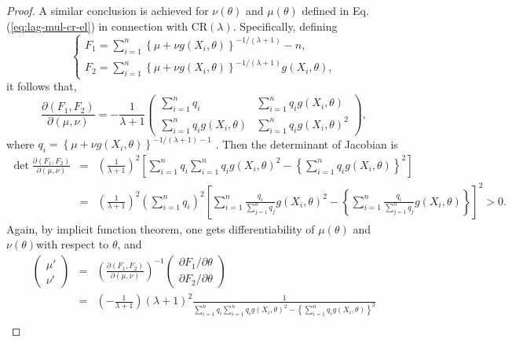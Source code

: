 \begin{proof}
A similar conclusion is achieved for $\nu\left(\theta\right)$ and
$\mu\left(\theta\right)$ defined in Eq. (\ref{eq:lag-mul-cr-el}) in
connection with CR$\left(\lambda\right)$. Specifically, defining
\[
\begin{cases}
F_{1}=\sum_{i=1}^{n}\left\{ \mu+\nu g\left(X_{i},\theta\right)\right\} ^{-1/(\lambda+1)}-n,\\
F_{2}=\sum_{i=1}^{n}\left\{ \mu+\nu g\left(X_{i},\theta\right)\right\} ^{-1/(\lambda+1)}g\left(X_{i},\theta\right),
\end{cases}
\]
it follows that,
\[
\frac{\partial\left(F_{1},F_{2}\right)}{\partial\left(\mu,\nu\right)}=-\frac{1}{\lambda+1}\left(\begin{array}{cc}
\sum_{i=1}^{n}q_{i} & \sum_{i=1}^{n}q_{i} g\left(X_{i},\theta\right)\\
\sum_{i=1}^{n}q_{i} g\left(X_{i},\theta\right) & \sum_{i=1}^{n}q_{i} g\left(X_{i},\theta\right)^{2}
\end{array}\right),
\]
 where $q_{i}=\left\{ \mu+\nu g\left(X_{i},\theta\right)\right\} ^{-1/(\lambda+1)-1}$
. Then the determinant of Jacobian is 
\begin{eqnarray*}
\det\frac{\partial\left(F_{1},F_{2}\right)}{\partial\left(\mu,\nu\right)} & = & \left(\frac{1}{\lambda+1}\right)^{2}\left[\sum_{i=1}^{n}q_{i}\sum_{i=1}^{n}q_{i}g\left(X_{i},\theta\right)^{2}-\left\{ \sum_{i=1}^{n}q_{i}g\left(X_{i},\theta\right)\right\} ^{2}\right]\\
 & = & \left(\frac{1}{\lambda+1}\right)^{2}\left(\sum_{i=1}^{n}q_{i}\right)^{2}\left[\sum_{i=1}^{n}\frac{q_{i}}{\sum_{j=1}^{n}q_{j}}g\left(X_{i},\theta\right)^{2}-\left\{ \sum_{i=1}^{n}\frac{q_{i}}{\sum_{j=1}^{n}q_{j}}g\left(X_{i},\theta\right)\right\} \right]^{2}>0.
\end{eqnarray*}
Again, by implicit function theorem, one gets differentiability of
$\mu\left(\theta\right)$ and $\nu\left(\theta\right)$with respect
to $\theta$, and 
\begin{eqnarray}
\left(\begin{array}{c}
\mu'\\
\nu'
\end{array}\right) & = & \left(\frac{\partial\left(F_{1},F_{2}\right)}{\partial\left(\mu,\nu\right)}\right)^{-1}\left(\begin{array}{c}
\partial F_{1}/\partial\theta\\
\partial F_{2}/\partial\theta
\end{array}\right)\nonumber \\
 & = & \left(-\frac{1}{\lambda+1}\right)\left(\lambda+1\right)^{2}\frac{1}{\sum_{i=1}^{n}q_{i}\sum_{i=1}^{n}q_{i}g\left(X_{i},\theta\right)^{2}-\left\{ \sum_{i=1}^{n}q_{i}g\left(X_{i},\theta\right)\right\} ^{2}}\nonumber \\

\end{eqnarray}
\end{proof}
